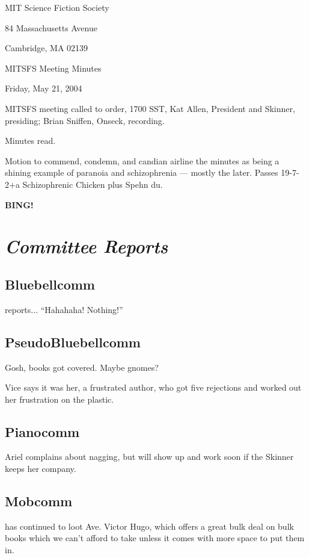 \documentclass[10pt]{article}
\newcommand{\bing}{{\bf BING!} }
\newcommand{\goto}[1]{\bing \vskip 12pt \section*{{\em{#1}}}}
\newcommand{\ps}{ plus Spehn\xspace}
\begin{document}
\begin{center}

MIT Science Fiction Society 

84 Massachusetts Avenue

Cambridge, MA 02139

\vspace{12pt}

MITSFS Meeting Minutes 

Friday, May 21, 2004

\end{center}
 
\vspace{18pt}

\setlength{\parskip}{6pt}

\noindent
MITSFS meeting called to order, 1700 SST, Kat Allen, President and
Skinner, presiding; Brian Sniffen,  Onseck, recording.

Minutes read.

Motion to commend, condemn, and candian airline the minutes as being a
shining example of paranoia and schizophrenia --- mostly the later.
Passes 19-7-2+a Schizophrenic Chicken\ps du.

\goto{Committee Reports}
\subsection*{Bluebellcomm}
reports... ``Hahahaha!  Nothing!''

\subsection*{PseudoBluebellcomm}
Gosh, books got covered.  Maybe gnomes?

Vice says it was her, a frustrated author, who got five rejections and
worked out her frustration on the plastic.

\subsection*{Pianocomm}

Ariel complains about nagging, but will show up and work soon if the
Skinner keeps her company.

\subsection*{Mobcomm}
has continued to loot Ave. Victor Hugo, which offers a great bulk deal
on bulk books which we can't afford to take unless it comes with more
space to put them in.
\end{document}
